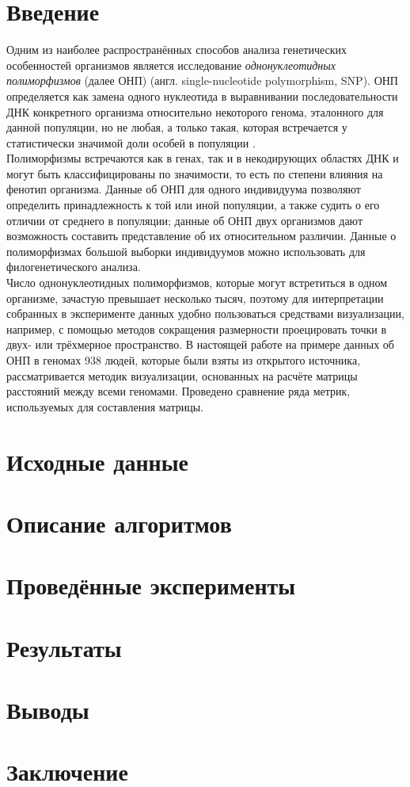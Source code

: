 \documentclass[main.tex]{subfiles}
\begin{document}
\section{Введение} \label{intro}

Одним из наиболее распространённых способов анализа генетических особенностей организмов является исследование \textit{однонуклеотидных полиморфизмов} (далее ОНП) (англ. single-nucleotide polymorphism, SNP). ОНП определяется как замена одного нуклеотида в выравнивании последовательности ДНК конкретного организма относительно некоторого генома, эталонного для данной популяции, но не любая, а только такая, которая встречается у статистически значимой доли особей в популяции \cite{butler}.\\
Полиморфизмы встречаются как в генах, так и в некодирующих областях ДНК и могут быть классифицированы по значимости, то есть по степени влияния на фенотип организма. Данные об ОНП для одного индивидуума позволяют определить принадлежность к той или иной популяции, а также судить о его отличии от среднего в популяции; данные об ОНП двух организмов дают возможность составить представление об их относительном различии. Данные о полиморфизмах большой выборки индивидуумов можно использовать для филогенетического анализа. \\
Число однонуклеотидных полиморфизмов, которые могут встретиться в одном организме, зачастую превышает несколько тысяч, поэтому для интерпретации собранных в эксперименте данных удобно пользоваться средствами визуализации, например, с помощью методов сокращения размерности проецировать точки в двух- или трёхмерное пространство. В настоящей работе на примере данных об ОНП в геномах 938 людей, которые были взяты из открытого источника, рассматривается методик визуализации, основанных на расчёте матрицы расстояний между всеми геномами. Проведено сравнение ряда метрик, используемых для составления матрицы.

\newpage
\section{Исходные данные} \label{input}

\section{Описание алгоритмов} \label{alg_desc}

\section{Проведённые эксперименты}\label{experiments}

\section{Результаты}

\section{Выводы}

\section{Заключение} %
	
\end{document}
